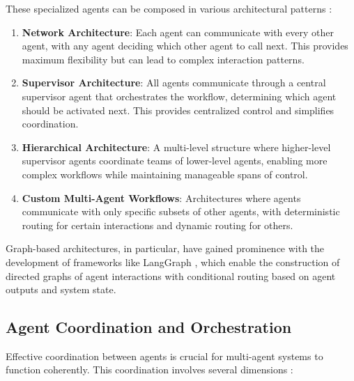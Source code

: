 These specialized agents can be composed in various architectural patterns \citep{langchain2025langgraph}:

\begin{enumerate}
    \item \textbf{Network Architecture}: Each agent can communicate with every other agent, with any agent deciding which other agent to call next. This provides maximum flexibility but can lead to complex interaction patterns.
    
    \item \textbf{Supervisor Architecture}: All agents communicate through a central supervisor agent that orchestrates the workflow, determining which agent should be activated next. This provides centralized control and simplifies coordination.
    
    \item \textbf{Hierarchical Architecture}: A multi-level structure where higher-level supervisor agents coordinate teams of lower-level agents, enabling more complex workflows while maintaining manageable spans of control.
    
    \item \textbf{Custom Multi-Agent Workflows}: Architectures where agents communicate with only specific subsets of other agents, with deterministic routing for certain interactions and dynamic routing for others.
\end{enumerate}

Graph-based architectures, in particular, have gained prominence with the development of frameworks like LangGraph \citep{langchain2025langgraph}, which enable the construction of directed graphs of agent interactions with conditional routing based on agent outputs and system state.

\subsection{Agent Coordination and Orchestration}
\label{sec:agent-coordination}
Effective coordination between agents is crucial for multi-agent systems to function coherently. This coordination involves several dimensions \citep{akira2025coordination}:

